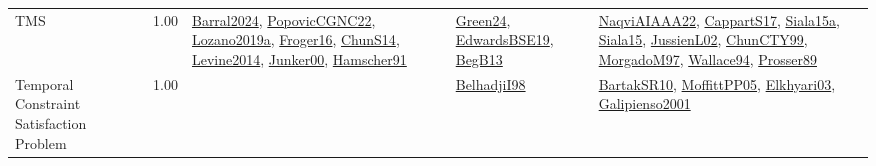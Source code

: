 {\begin{longtable}{p{3cm}r>{\raggedright\arraybackslash}p{6cm}>{\raggedright\arraybackslash}p{6cm}>{\raggedright\arraybackslash}p{8cm}}
\index{TMS}\index{Classification!TMS}TMS &  1.00 & \hyperref[detail:Barral2024]{Barral2024}, \hyperref[detail:PopovicCGNC22]{PopovicCGNC22}, \hyperref[detail:Lozano2019a]{Lozano2019a}, \hyperref[detail:Froger16]{Froger16}, \hyperref[detail:ChunS14]{ChunS14}, \hyperref[detail:Levine2014]{Levine2014}, \hyperref[detail:Junker00]{Junker00}, \hyperref[detail:Hamscher91]{Hamscher91} & \hyperref[detail:Green24]{Green24}, \hyperref[detail:EdwardsBSE19]{EdwardsBSE19}, \hyperref[detail:BegB13]{BegB13} & \hyperref[detail:NaqviAIAAA22]{NaqviAIAAA22}, \hyperref[detail:CappartS17]{CappartS17}, \hyperref[detail:Siala15a]{Siala15a}, \hyperref[detail:Siala15]{Siala15}, \hyperref[detail:JussienL02]{JussienL02}, \hyperref[detail:ChunCTY99]{ChunCTY99}, \hyperref[detail:MorgadoM97]{MorgadoM97}, \hyperref[detail:Wallace94]{Wallace94}, \hyperref[detail:Prosser89]{Prosser89}\\
\index{Temporal Constraint Satisfaction Problem}\index{Classification!Temporal Constraint Satisfaction Problem}Temporal Constraint Satisfaction Problem &  1.00 &  & \hyperref[detail:BelhadjiI98]{BelhadjiI98} & \hyperref[detail:BartakSR10]{BartakSR10}, \hyperref[detail:MoffittPP05]{MoffittPP05}, \hyperref[detail:Elkhyari03]{Elkhyari03}, \hyperref[detail:Galipienso2001]{Galipienso2001}\\

\end{longtable}}
